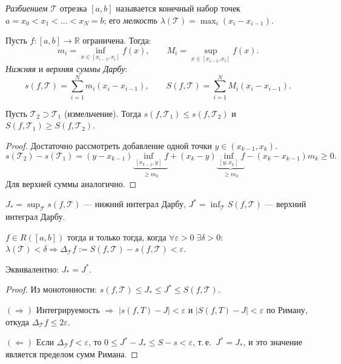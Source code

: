 
\begin{defn}
  \emph{Разбиением} $\mathcal{T}$ отрезка $[a,b]$ называется конечный набор точек
  $a = x_0 < x_1 < \ldots < x_N = b$; его \emph{мелкость} $\lambda(\mathcal{T}) = \max_i(x_i - x_{i-1})$.

  Пусть $f: [a,b] \to \mathbb{R}$ ограничена. Тогда:
  \[
    m_i = \inf_{x \in [x_{i-1}, x_i]} f(x), \qquad M_i = \sup_{x \in [x_{i-1}, x_i]} f(x).
  \]
  \emph{Нижняя} и \emph{верхняя суммы Дарбу}:
  \[
    s(f, \mathcal{T}) = \sum_{i=1}^N m_i(x_i - x_{i-1}), \qquad
    S(f, \mathcal{T}) = \sum_{i=1}^N M_i(x_i - x_{i-1}).
  \]
\end{defn}

\begin{theorem}
  Пусть $\mathcal{T}_2 \supset \mathcal{T}_1$ (измельчение).
  Тогда $s(f, \mathcal{T}_1) \leq s(f, \mathcal{T}_2)$ и $S(f, \mathcal{T}_1) \geq S(f, \mathcal{T}_2)$.
  \begin{proof}
    Достаточно рассмотреть добавление одной точки $y \in (x_{k-1}, x_k)$.
    \[
      s(\mathcal{T}_2) - s(\mathcal{T}_1)
      = (y - x_{k-1})\underbrace{\inf_{[x_{k-1},y]} f}_{\geq m_k}
      + (x_k - y)\underbrace{\inf_{[y, x_k]} f}_{\geq m_k}
      - (x_k - x_{k-1}) m_k \geq 0.
    \]
    Для верхней суммы аналогично. \qedhere
  \end{proof}
\end{theorem}

\begin{defn}
  $J_* = \sup_{\mathcal{T}} s(f, \mathcal{T})$ --- нижний интеграл Дарбу,
  $J^* = \inf_{\mathcal{T}} S(f, \mathcal{T})$ --- верхний интеграл Дарбу.
\end{defn}

\begin{theorem}
  $f \in R([a,b])$ тогда и только тогда, когда
  $\forall\varepsilon>0\;\exists\delta>0$: $\lambda(\mathcal{T}) < \delta \Rightarrow
  \Delta_\mathcal{T} f := S(f,\mathcal{T}) - s(f,\mathcal{T}) < \varepsilon$.

  Эквивалентно: $J_* = J^*$.
  \begin{proof}
    Из монотонности: $s(f,\mathcal{T}) \leq J_* \leq J^* \leq S(f,\mathcal{T})$.

    $(\Rightarrow)$ Интегрируемость $\Rightarrow$ $|s(f,T)-J|<\varepsilon$ и $|S(f,T)-J|<\varepsilon$
    по Риману, откуда $\Delta_\mathcal{T} f \leq 2\varepsilon$.

    $(\Leftarrow)$ Если $\Delta_\mathcal{T} f < \varepsilon$, то $0 \leq J^* - J_* \leq S - s < \varepsilon$,
    т.\,е.\ $J^* = J_*$, и это значение является пределом сумм Римана. \qedhere
  \end{proof}
\end{theorem}
